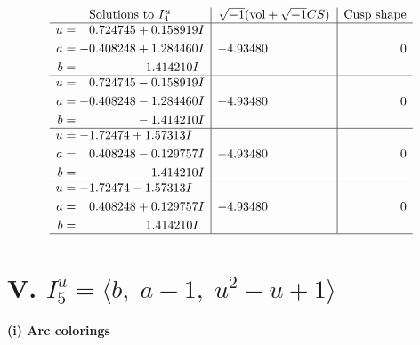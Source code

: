 \documentclass[1p]{elsarticle_modified}
\theoremstyle{definition}
\newcommand{\I}{\sqrt{-1}}
\begin{document}
$$\begin{array}{c|c|c}  
\text{Solutions to }I^u_{4}& \I (\text{vol} + \sqrt{-1}CS) & \text{Cusp shape}\\
 \hline 
\begin{aligned}
u &= \phantom{-}0.724745 + 0.158919 I \\
a &= -0.408248 + 1.284460 I \\
b &= \phantom{-0.000000 -}1.414210 I\end{aligned}
 & -4.93480\phantom{ +0.000000I} & \phantom{-0.000000 } 0 \\ \hline\begin{aligned}
u &= \phantom{-}0.724745 - 0.158919 I \\
a &= -0.408248 - 1.284460 I \\
b &= \phantom{-0.000000 } -1.414210 I\end{aligned}
 & -4.93480\phantom{ +0.000000I} & \phantom{-0.000000 } 0 \\ \hline\begin{aligned}
u &= -1.72474 + 1.57313 I \\
a &= \phantom{-}0.408248 - 0.129757 I \\
b &= \phantom{-0.000000 } -1.414210 I\end{aligned}
 & -4.93480\phantom{ +0.000000I} & \phantom{-0.000000 } 0 \\ \hline\begin{aligned}
u &= -1.72474 - 1.57313 I \\
a &= \phantom{-}0.408248 + 0.129757 I \\
b &= \phantom{-0.000000 -}1.414210 I\end{aligned}
 & -4.93480\phantom{ +0.000000I} & \phantom{-0.000000 } 0\\
 \hline 
 \end{array}$$\newpage\newpage\renewcommand{\arraystretch}{1}
\centering \section*{V. $I^u_{5}= \langle b,\;a-1,\;u^2- u+1 \rangle$}
\flushleft \textbf{(i) Arc colorings}\\
\end{document}
